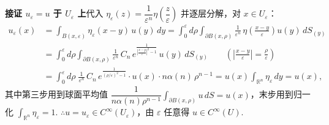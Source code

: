 \documentclass{article}
\begin{document}
\noindent\textbf{接证 $u_\varepsilon = u$ 于 $U_\varepsilon$ 上}\quad 代入 $\eta_\varepsilon(z) = \dfrac{1}{\varepsilon^n} \eta\left(\dfrac{z}{\varepsilon}\right)$ 并逐层分解，对 $x \in U_\varepsilon$：
\[
\begin{aligned}
	u_\varepsilon(x) &= \int_{B(x,\varepsilon)} \eta_\varepsilon(x-y)\, u(y)\, dy = \int_0^\varepsilon d\rho \int_{\partial B(x,\rho)} \frac{1}{\varepsilon^n}\, \eta\!\left(\frac{x-y}{\varepsilon}\right) u(y)\, dS_{(y)} \\
	&= \int_0^\varepsilon d\rho \int_{\partial B(x,\rho)} \frac{1}{\varepsilon^n}\, C_n\, e^{\frac{1}{\left|\frac{x-y}{\varepsilon}\right|^2 - 1}}\, u(y)\, dS_{(y)} \qquad \left(\left|\frac{x-y}{\varepsilon}\right| = \frac{\rho}{\varepsilon}\right) \\
	&= \int_0^\varepsilon d\rho\; \frac{1}{\varepsilon^n}\, C_n\, e^{\frac{1}{(\rho/\varepsilon)^2 - 1}} \cdot u(x) \cdot n\alpha(n)\, \rho^{n-1} = u(x) \int_{\mathbb{R}^n} \eta_\varepsilon\, dy = u(x),
\end{aligned}
\]
其中第三步用到球面平均值 $\dfrac{1}{n\alpha(n)\rho^{n-1}} \displaystyle\int_{\partial B(x,\rho)} u\, dS = u(x)$，末步用到归一化 $\displaystyle\int_{\mathbb{R}^n} \eta_\varepsilon = 1$. $\therefore u = u_\varepsilon \in C^\infty(U_\varepsilon)$，由 $\varepsilon$ 任意得 $u \in C^\infty(U)$.
\end{document}
